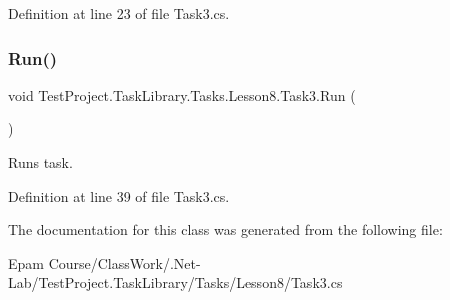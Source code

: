 Definition at line 23 of file Task3.\+cs.

\mbox{\label{class_test_project_1_1_task_library_1_1_tasks_1_1_lesson8_1_1_task3_a161751513c16ebf362e8d03745568136}} 
\subsubsection{\texorpdfstring{Run()}{Run()}}
{\footnotesize\ttfamily void Test\+Project.\+Task\+Library.\+Tasks.\+Lesson8.\+Task3.\+Run (\begin{DoxyParamCaption}{ }\end{DoxyParamCaption})}



Runs task. 



Definition at line 39 of file Task3.\+cs.



The documentation for this class was generated from the following file\+:\begin{DoxyCompactItemize}
\item 
Epam Course/\+Class\+Work/.\+Net-\/\+Lab/\+Test\+Project.\+Task\+Library/\+Tasks/\+Lesson8/Task3.\+cs\end{DoxyCompactItemize}
